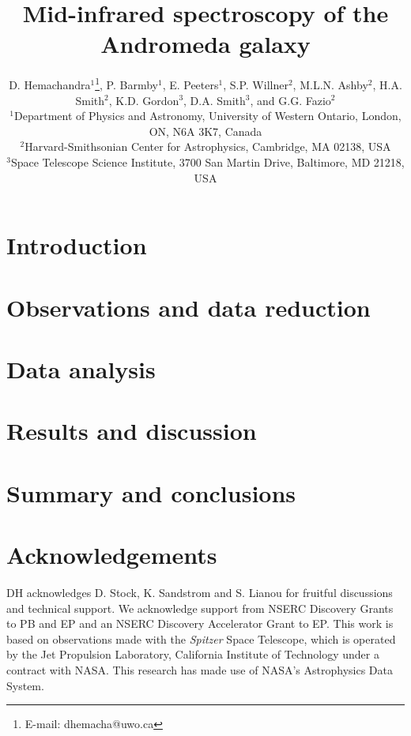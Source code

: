 \documentclass[useAMS,usenatbib,a4paper]{mn2e}
\title[Mid-infrared spectroscopy of M31]{Mid-infrared spectroscopy of the Andromeda galaxy}
\author[D. Hemachandra et al.]
{D. Hemachandra$^{1}$\thanks{E-mail: dhemacha@uwo.ca},
P. Barmby$^{1}$, 
E. Peeters$^{1}$, 
S.P. Willner$^{2}$, 
M.L.N. Ashby$^{2}$,
H.A. Smith$^{2}$, 
\newauthor 
K.D. Gordon$^{3}$,
D.A. Smith$^{3}$,
and
G.G. Fazio$^{2}$\\
$^{1}$Department of Physics and Astronomy, University of Western Ontario, London, ON, N6A 3K7, Canada\\
$^{2}$Harvard-Smithsonian Center for Astrophysics, Cambridge, MA 02138, USA\\
$^{3}$Space Telescope Science Institute, 3700 San Martin Drive, Baltimore, MD 21218, USA
}
\begin{document}
\date{}

\maketitle

\label{firstpage}



\section{Introduction}




\section{Observations and data reduction}




\section{Data analysis}
\label{sect:data_analysis}



\section{Results and discussion}



\section{Summary and conclusions}



\section*{Acknowledgements}


DH acknowledges D. Stock, K. Sandstrom and S. Lianou for fruitful discussions and technical support. 
We acknowledge support from NSERC Discovery Grants to PB and EP and an NSERC Discovery Accelerator Grant to EP. 
This work is based on observations made with the {\em Spitzer} Space Telescope, which is operated by the 
Jet Propulsion Laboratory, California Institute of Technology under a contract with NASA.
This research has made use of NASA's Astrophysics Data System.




{}

\bsp

\label{lastpage}
\end{document}

